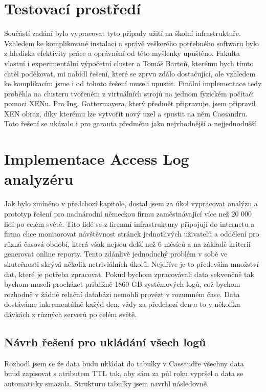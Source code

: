\documentclass[thesis=M,czech]{FITthesis}[2012/06/26]
\begin{document}
\section{Testovací prostředí}
Součástí zadání bylo vypracovat tyto případy užití na školní infrastruktuře. Vzhledem ke komplikované instalaci a správě veškerého potřebného softwaru bylo z hlediska efektivity práce a oprávnění od této myšlenky upuštěno. Fakulta vlastní i experimentální výpočetní cluster a Tomáš Bartoň, kterému bych tímto chtěl poděkovat, mi nabídl řešení, které se zprvu zdálo dostačující, ale vzhledem ke komplikacím jsme i od tohoto řešení museli upustit. Finální implementace tedy proběhla na clusteru tvořeném z virtuálních strojů na jednom fyzickém počítači pomoci XENu. Pro Ing. Gattermayera, který předmět připravuje, jsem připravil XEN obraz, díky kterému lze vytvořit nový uzel a spustit na něm Cassandru. Toto řešení se ukázalo i pro garanta předmětu jako nejvhodnější a nejjednodušší. 

\section{Implementace Access Log analyzéru}
Jak bylo zmíněno v předchozí kapitole, dostal jsem za úkol vypracovat analýzu a prototyp řešení pro nadnárodní německou firmu zaměstnávající  více než 20 000 lidí po celém světě. Tito lidé se z firemní infrastruktury připojují do internetu a firma chce monitorovat návštěvnost stránek jednotlivých uživatelů a oddělení pro různá časová období, která však nejsou delší než 6 měsíců a na základě kriterií generovat online reporty. Tento zdánlivě jednoduchý problém v sobě ve skutečnosti skrývá několik netriviálních úkolů. Nejdříve je to především množství dat, které je potřeba zpracovat. Pokud bychom zpracovávali data sekvenčně tak bychom museli procházet približně 1860 GB systémových logů, což bychom rozhodně v žádné relační databázi nemohli provézt v rozumném čase. Data dostáváme inkrementálně kažýd den, vždy za předchozí den a to v několika dávkách z různých serverů po celém světě. 


\subsection{Návrh řešení pro ukládání všech logů}
Rozhodl jsem se že data budu ukládat do tabulky v Cassandře všechny data buud zapisovat s atributem TTL tak, aby sám za půl roku vypršel a data se automaticky smazala. Strukturu tabulky jsem navrhl následovně. 
\end{document}
